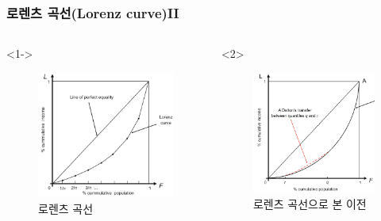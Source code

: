 \documentclass[aspectratio=169,xcolor=dvipsnames,]{beamer}
\begin{document}
\begin{frame}
\frametitle{로렌츠 곡선(Lorenz curve)II}
    \begin{columns}
        \begin{column}{.5\textwidth}<1->
            \begin{figure}
                \centering
                \includegraphics[width=.78\textwidth]{pic/lorenz.png}
                \caption{로렌츠 곡선}
            \end{figure}
        \end{column}
        \begin{column}{.5\textwidth}<2>
            \begin{figure}
                \centering
                \includegraphics[width=.78\textwidth]{pic/lorenzt.png}
                \caption{로렌츠 곡선으로 본 이전}
            \end{figure}
        \end{column}
    \end{columns}
\end{frame}
\end{document}
